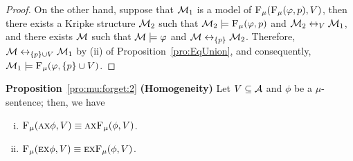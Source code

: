 \documentclass[runningheads]{llncs}
\begin{document}
\begin{proof}
 On the other hand, suppose that ${\cal M}_1$ is a model of ${\textsc{F}_{\textsc{$\mu$}}}({\textsc{F}_{\textsc{$\mu$}}}(\varphi, p), V)$, then there exists a Kripke structure ${\cal M}_2$ such that ${\cal M}_2 \models {\textsc{F}_{\textsc{$\mu$}}}(\varphi, p)$ and ${\cal M}_2 \leftrightarrow_V {\cal M}_1$, and there exists ${\cal M}$ such that ${\cal M} \models \varphi$ and ${\cal M} \leftrightarrow_{\{p\}} {\cal M}_2$. Therefore, ${\cal M} \leftrightarrow_{\{p\} \cup V} {\cal M}_1$ by (ii) of Proposition~\ref{pro:EqUnion}, and consequently, ${\cal M}_1 \models {\textsc{F}_{\textsc{$\mu$}}}(\varphi, \{p\} \cup V)$.
 \end{proof}



\noindent\textbf{Proposition}~\ref{pro:mu:forget:2} \textbf{(Homogeneity)}
 Let $V\subseteq\cal A$ and $\phi$ be a $\mu$-sentence; then, we have %
   \begin{enumerate}[(i)]
     \item ${\textsc{F}_{\textsc{$\mu$}}}(\textsc{a}\textsc{x}\phi,V)\equiv \textsc{a}\textsc{x} {\textsc{F}_{\textsc{$\mu$}}}(\phi,V)$.
     \item ${\textsc{F}_{\textsc{$\mu$}}}(\textsc{e}\textsc{x}\phi,V)\equiv\textsc{e}\textsc{x} {\textsc{F}_{\textsc{$\mu$}}}(\phi,V)$.
   \end{enumerate}
\end{document}
